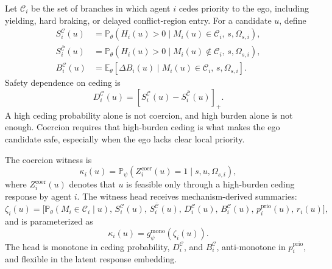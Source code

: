 \documentclass[10pt]{article}
\newcommand{\E}{\mathbb{E}}
\newcommand{\Prob}{\mathbb{P}}
\newcommand{\cC}{\mathcal{C}}
\begin{document}
Let \(\cC_i\) be the set of branches in which agent \(i\) cedes priority to the ego, including yielding, hard braking, or delayed conflict-region entry. For a candidate \(u\), define
\begin{align}
    S_i^{\cC}(u)
    &=
    \Prob_\theta
    \left(
    H_i(u)>0
    \mid
    M_i(u)\in\cC_i,\,
    s,\Omega_{s,i}
    \right),
    \label{eq:cede_safety}\\
    S_i^{\bar{\cC}}(u)
    &=
    \Prob_\theta
    \left(
    H_i(u)>0
    \mid
    M_i(u)\notin\cC_i,\,
    s,\Omega_{s,i}
    \right),
    \label{eq:noncede_safety}\\
    B_i^{\cC}(u)
    &=
    \E_\theta
    \left[
    \Delta B_i(u)
    \mid
    M_i(u)\in\cC_i,\,
    s,\Omega_{s,i}
    \right].
    \label{eq:cede_burden}
\end{align}
Safety dependence on ceding is
\begin{equation}
    D_i^{\cC}(u)
    =
    \left[
    S_i^{\cC}(u)
    -
    S_i^{\bar{\cC}}(u)
    \right]_+.
    \label{eq:safety_dependence}
\end{equation}
A high ceding probability alone is not coercion, and high burden alone is not enough. Coercion requires that high-burden ceding is what makes the ego candidate safe, especially when the ego lacks clear local priority.

The coercion witness is
\begin{equation}
    \kappa_i(u)
    =
    \Prob_\psi
    \left(
    Z_i^{\mathrm{coer}}(u)=1
    \mid
    s,u,\Omega_{s,i}
    \right),
    \label{eq:coercion_witness}
\end{equation}
where \(Z_i^{\mathrm{coer}}(u)\) denotes that \(u\) is feasible only through a high-burden ceding response by agent \(i\). The witness head receives mechanism-derived summaries:
\begin{equation}
    \zeta_i(u)
    =
    \Big[
    \Prob_\theta(M_i\in\cC_i\mid u),\,
    S_i^{\cC}(u),\,
    S_i^{\bar{\cC}}(u),\,
    D_i^{\cC}(u),\,
    B_i^{\cC}(u),\,
    p_i^{\mathrm{prio}}(u),\,
    r_i(u)
    \Big],
    \label{eq:witness_features}
\end{equation}
and is parameterized as
\begin{equation}
    \kappa_i(u)=g_\psi^{\mathrm{mono}}\!\left(\zeta_i(u)\right).
    \label{eq:monotone_witness_head}
\end{equation}
The head is monotone in ceding probability, \(D_i^{\cC}\), and \(B_i^{\cC}\), anti-monotone in \(p_i^{\mathrm{prio}}\), and flexible in the latent response embedding.
\end{document}
